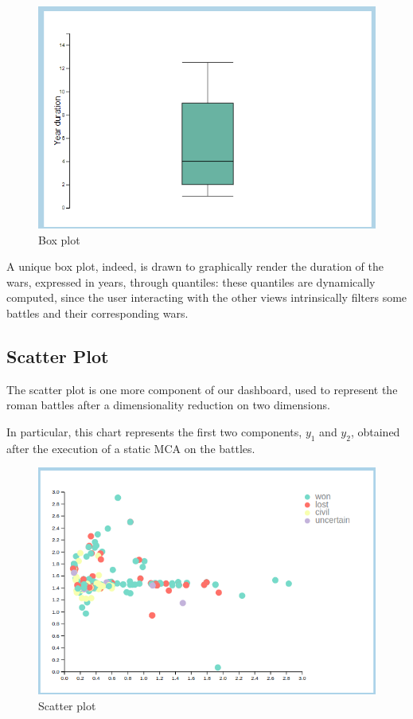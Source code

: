 \begin{figure}[h]
    \centering
    \includegraphics[scale=0.5]{./images/box_plot.png}
    \caption{Box plot}
\end{figure}

A unique box plot, indeed, is drawn to graphically render the duration of the wars, expressed in years, through quantiles: these quantiles are dynamically computed, since the user interacting with the other views intrinsically filters some battles and their corresponding wars.

\subsection{Scatter Plot}
The scatter plot is one more component of our dashboard, used to represent the roman battles after a dimensionality reduction on two dimensions.

In particular, this chart represents the first two components, $y_1$ and $y_2$, obtained after the execution of a static MCA on the battles.

\begin{figure}[h]
    \centering
    \includegraphics[scale=0.30]{./images/scatter_plot.png}
    \caption{Scatter plot}
\end{figure}


